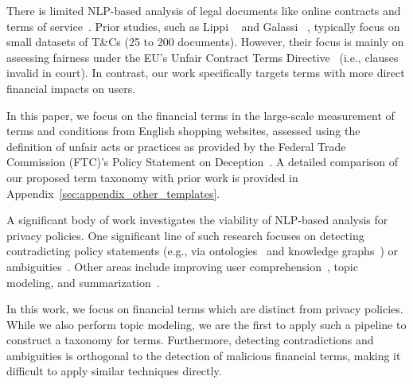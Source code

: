 There is limited NLP-based analysis of legal documents like online contracts and terms of service~\citep{lagioia2017automated, braun2021nlp, lippi2019claudette, limsopatham2021effectively, jablonowska2021assessing, galassi2024unfair}. Prior studies, such as Lippi \etal~\citep{lippi2019claudette} and Galassi \etal~\citep{galassi2024unfair}, typically focus on small datasets of T\&Cs (25 to 200 documents). However, their focus is mainly on assessing fairness under the EU’s Unfair Contract Terms Directive~\citep{CouncilDirective1993} (i.e., clauses invalid in court). In contrast, our work specifically targets terms with more direct financial impacts on users.


In this paper, we focus on the financial terms in the large-scale measurement of terms and conditions from English shopping websites, assessed using the definition of unfair acts or practices as provided by the Federal Trade Commission (FTC)'s Policy Statement on Deception~\citep{ftc1983deception}. A detailed comparison of our proposed term taxonomy with prior work is provided in Appendix~\ref{sec:appendix_other_templates}.

A significant body of work investigates the viability of NLP-based analysis for privacy policies. One significant line of such research focuses on detecting contradicting policy statements (e.g., via ontologies~\citep{andow2019policylint} and knowledge graphs~\citep{cui2023poligraph}) or ambiguities~\citep{shvartzshnaider2019going}. Other areas include improving user comprehension~\citep{harkous2018polisis}, topic modeling, and summarization~\citep{alabduljabbar2021automated, sarne2019unsupervised}.

In this work, we focus on financial terms which are distinct from privacy policies. While we also perform topic modeling, we are the first to apply such a pipeline to construct a taxonomy for \termname terms. Furthermore, detecting contradictions and ambiguities is orthogonal to the detection of malicious financial terms, making it difficult to apply similar techniques directly.







